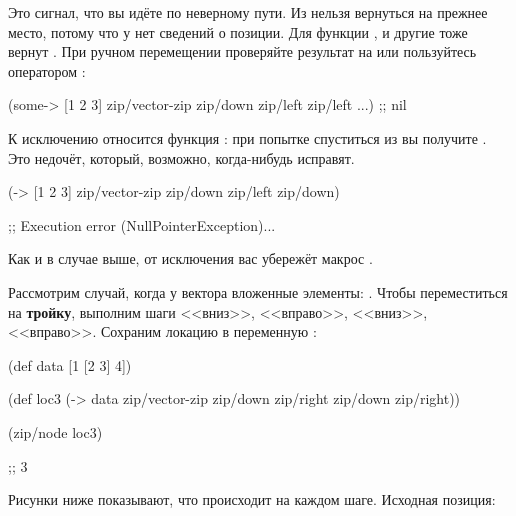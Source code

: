 Это сигнал, что вы идёте по неверному пути. Из  нельзя вернуться на
прежнее место, потому что у  нет сведений о позиции. Для 
функции ,  и другие тоже вернут . При
ручном перемещении проверяйте результат на  или пользуйтесь оператором
:

\begin{english}
  \begin{clojure}
(some-> [1 2 3]
        zip/vector-zip
        zip/down
        zip/left
        zip/left
        ...)
;; nil
  \end{clojure}
\end{english}

К исключению относится функция : при попытке спуститься из  вы
получите . Это недочёт, который, возможно, когда-нибудь
исправят.


\begin{english}
  \begin{clojure}
(-> [1 2 3]
    zip/vector-zip
    zip/down
    zip/left
    zip/down)

;; Execution error (NullPointerException)...
  \end{clojure}
\end{english}

Как и в случае выше, от исключения вас убережёт макрос .

Рассмотрим случай, когда у вектора вложенные элементы: \code{[1 [2 3] 4]}. Чтобы
переместиться на \textbf{тройку}, выполним шаги <<вниз>>, <<вправо>>, <<вниз>>,
<<вправо>>. Сохраним локацию в переменную :

\begin{english}
  \begin{clojure}
(def data
  [1 [2 3] 4])

(def loc3
  (-> data
      zip/vector-zip
      zip/down
      zip/right
      zip/down
      zip/right))

(zip/node loc3)

;; 3
  \end{clojure}
\end{english}

Рисунки ниже показывают, что происходит на каждом шаге. Исходная позиция:

\begin{figure}[H]
  \centering
  
  \label{fig:chart-zip-04}
\end{figure}

